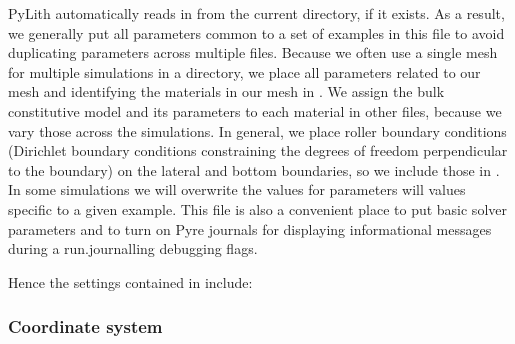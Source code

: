 PyLith automatically reads in  from the
current directory, if it exists. As a result, we generally put all
parameters common to a set of examples in this file to avoid
duplicating parameters across multiple files. Because we often use a
single mesh for multiple simulations in a directory, we place all
parameters related to our mesh and identifying the materials in our
mesh in . We assign the bulk constitutive
model and its parameters to each material in other files, because we
vary those across the simulations. In general, we place roller
boundary conditions (Dirichlet boundary conditions constraining the
degrees of freedom perpendicular to the boundary) on the lateral and
bottom boundaries, so we include those in . In
some simulations we will overwrite the values for parameters will
values specific to a given example. This file is also a convenient
place to put basic solver parameters and to turn on Pyre journals for
displaying informational messages during a run.journalling debugging
flags.

Hence the settings contained in  include:
\begin{inventory}
\end{inventory}

\subsubsection{Coordinate system}

